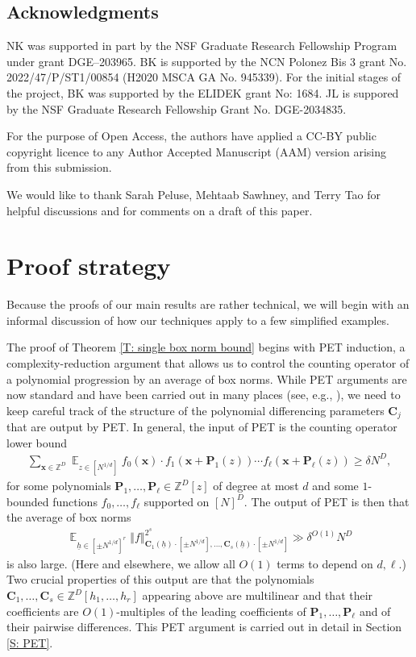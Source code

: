 \documentclass[11pt]{amsart}
\theoremstyle{definition}
\DeclareMathOperator*{\E}{\mathbb{E}}
\newcommand{\Z}{{\mathbb Z}}
\newcommand{\bc}{{\textbf{C}}}
\newcommand{\p}{{\textbf{P}}}
\newcommand{\bx}{{\textbf{x}}}
\newcommand{\uh}{{\underline{h}}}
\newcommand{\norm}[1]{\left\Vert #1\right\Vert}
\begin{document}
\subsection{Acknowledgments} NK was supported in part by the NSF Graduate Research Fellowship Program under grant DGE–203965. BK is supported by the NCN Polonez Bis 3 grant No. 2022/47/P/ST1/00854 (H2020 MSCA GA No. 945339). For the initial stages of the project, BK was supported by the ELIDEK grant No: 1684.  JL is suppored by the NSF Graduate Research Fellowship Grant No. DGE-2034835. 

For the purpose of Open Access, the authors have applied a CC-BY public copyright licence to any Author Accepted Manuscript (AAM) version arising from this submission.

We would like to thank Sarah Peluse, Mehtaab Sawhney, and Terry Tao for helpful discussions and for comments on a draft of this paper.


\section{Proof strategy}\label{S: strategy}
Because the proofs of our main results are rather technical, we will begin with an informal discussion of how our techniques apply to a few simplified examples.

The proof of Theorem \ref{T: single box norm bound} begins with PET induction, a complexity-reduction argument that allows us to control the counting operator of a polynomial progression by an average of box norms.  While PET arguments are now standard and have been carried out in many places (see, e.g., \cite{Ber87, BL96, DFKS22, Pel20, Pre17}), we need to keep careful track of the structure of the polynomial differencing parameters $\bc_j$ that are output by PET.  In general, the input of PET is the counting operator lower bound
\begin{align*}
    {\sum_{\bx\in\Z^D}\E_{z\in[N^{1/d}]} f_0(\bx)\cdot f_1(\bx+\p_1(z))\cdots f_\ell(\bx+\p_\ell(z))} \geq \delta N^D,
\end{align*}
for some polynomials $\p_1, \ldots, \p_\ell\in\Z^D[z]$ of degree at most $d$ and some $1$-bounded functions $f_0, \ldots, f_\ell$ supported on $[N]^D$.  The output of PET is then that the average of box norms 
\begin{align}\label{E: average of box norms of polynomials}
	 \E_{\uh\in[\pm N^{1/d}]^{r}}\norm{f}_{{\bc_1(\uh)\cdot[\pm N^{1/d}]}, \ldots, {\bc_s(\uh)\cdot[\pm N^{1/d}]}}^{2^s} \gg \delta^{O(1)} N^D
\end{align}
is also large. (Here and elsewhere, we allow all $O(1)$ terms to depend on $d,\ell$.)  Two crucial properties of this output are that the polynomials $\bc_1, \ldots, \bc_s\in\Z^D[h_1, \ldots, h_r]$ appearing above are multilinear and that their coefficients are $O(1)$-multiples of the leading coefficients of $\p_1, \ldots, \p_\ell$ and of their pairwise differences.  This PET argument is carried out in detail in Section \ref{S: PET}.
\end{document}
